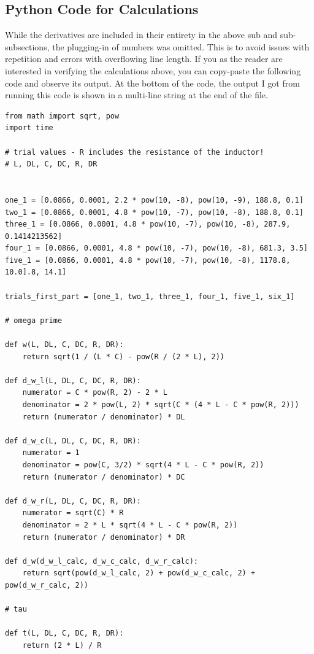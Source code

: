 \documentclass[12pt]{article}
\begin{document}
\clearpage
\subsection{Python Code for Calculations} \label{sec:Python_Code}
While the derivatives are included in their entirety in the above sub and sub-subsections, the plugging-in of numbers was omitted. This is to avoid issues with repetition and errors with overflowing line length. If you as the reader are interested in verifying the calculations above, you can copy-paste the following code and observe its output. At the bottom of the code, the output I got from running this code is shown in a multi-line string at the end of the file.

\begin{verbatim}
from math import sqrt, pow
import time

# trial values - R includes the resistance of the inductor!
# L, DL, C, DC, R, DR


one_1 = [0.0866, 0.0001, 2.2 * pow(10, -8), pow(10, -9), 188.8, 0.1] 
two_1 = [0.0866, 0.0001, 4.8 * pow(10, -7), pow(10, -8), 188.8, 0.1] 
three_1 = [0.0866, 0.0001, 4.8 * pow(10, -7), pow(10, -8), 287.9, 0.1414213562]
four_1 = [0.0866, 0.0001, 4.8 * pow(10, -7), pow(10, -8), 681.3, 3.5]
five_1 = [0.0866, 0.0001, 4.8 * pow(10, -7), pow(10, -8), 1178.8, 10.0].8, 14.1]

trials_first_part = [one_1, two_1, three_1, four_1, five_1, six_1]

# omega prime

def w(L, DL, C, DC, R, DR):
    return sqrt(1 / (L * C) - pow(R / (2 * L), 2))

def d_w_l(L, DL, C, DC, R, DR):
    numerator = C * pow(R, 2) - 2 * L
    denominator = 2 * pow(L, 2) * sqrt(C * (4 * L - C * pow(R, 2)))
    return (numerator / denominator) * DL

def d_w_c(L, DL, C, DC, R, DR):
    numerator = 1
    denominator = pow(C, 3/2) * sqrt(4 * L - C * pow(R, 2))
    return (numerator / denominator) * DC

def d_w_r(L, DL, C, DC, R, DR):
    numerator = sqrt(C) * R
    denominator = 2 * L * sqrt(4 * L - C * pow(R, 2))
    return (numerator / denominator) * DR

def d_w(d_w_l_calc, d_w_c_calc, d_w_r_calc):
    return sqrt(pow(d_w_l_calc, 2) + pow(d_w_c_calc, 2) + pow(d_w_r_calc, 2))

# tau

def t(L, DL, C, DC, R, DR):
    return (2 * L) / R


\end{verbatim}
\end{document}
